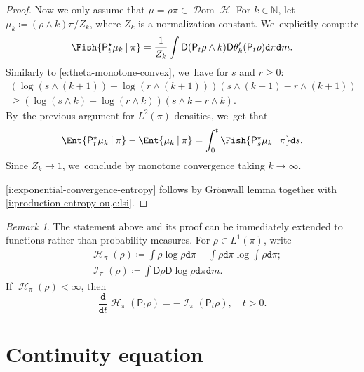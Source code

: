 \documentclass[10pt]{amsart}
\theoremstyle{definition}
\theoremstyle{remark}
\newtheorem{remark}[theorem]{Remark}
\newcommand{\given}[1][]{%
\nonscript\:#1\vert
\allowbreak
\nonscript\:
\mathopen{}}
\DeclareMathOperator{\ent}{\mathcal{H}}
\DeclareMathOperator{\fish}{\mathcal{I}}
\DeclareMathOperator{\dom}{\mathscr{D}om}
\begin{document}
\begin{proof}
Now we only assume that $\mu = \rho \pi \in \dom \ent$
For $k \in \mathbb{N}$, let $\mu_{k} \coloneq (\rho \wedge k) \pi / Z_{k}$, where $Z_k$ is a normalization constant. We~explicitly compute
\begin{equation*}
\Fish{ \mathsf{P}_{t}^{\star} \mu_{k} \given \pi } = \frac{1}{Z_{k}} \int \mathsf{D} (\mathsf{P}_{t} \rho \wedge k) \mathsf{D} \theta'_{k}(\mathsf{P}_{t} \rho) \mathtt{d} \pi \mathtt{d} m.
\end{equation*}
Similarly to \cref{e:theta-monotone-convex}, we~have for $s$ and $r \geq 0$:
\begin{multline*}
(\log(s \wedge (k+1)) - \log(r \wedge (k+1)))(s \wedge (k+1) - r \wedge (k+1))\\
\geq (\log(s \wedge k) - \log(r \wedge k))(s \wedge k - r \wedge k).
\end{multline*}
By~the previous argument for $L^{2}(\pi)$-densities, we~get that
\begin{equation*}
\Ent{ \mathsf{P}^{\star}_{t} \mu_{k} \given \pi } - \Ent{ \mu_{k} \given \pi } = \int_{0}^{t} \Fish{ \mathsf{P}_{s}^{\star} \mu_{k} \given \pi } \mathtt{d} s.
\end{equation*}
Since $Z_{k} \to 1$, we~conclude by monotone convergence taking $k \to \infty$.

\cref{i:exponential-convergence-entropy}
follows by Grönwall lemma together with \cref{i:production-entropy-ou,e:lsi}.
\end{proof}

\begin{remark}
The statement above and its proof can be immediately extended to functions rather than probability measures.
For $\rho \in L^{1}(\pi)$, write
\begin{align*}
& \ent_{\pi}(\rho) \coloneq \int \rho \log \rho \mathtt{d} \pi - \int \rho \mathtt{d} \pi \log \int \rho \mathtt{d} \pi;
\\ & \fish_{\pi}(\rho) \coloneq \int \mathsf{D} \rho \mathsf{D} \log \rho \mathtt{d} \pi \mathtt{d} m.
\end{align*}
If $\ent_{\pi}(\rho) < \infty$, then
\begin{equation*}
\frac{\mathtt{d}}{\mathtt{d} t} \ent_{\pi}(\mathsf{P}_{t}\rho) = - \fish_{\pi}(\mathsf{P}_{t} \rho), \quad t > 0.
\end{equation*}
\end{remark}

\section{Continuity equation}\label{s:continuity-equation}
\end{document}
